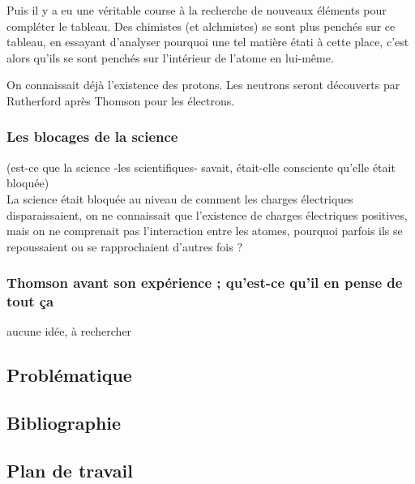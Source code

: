 \documentclass[../main.tex]{subfiles}
\begin{document}
Puis il y a eu une véritable course à la recherche de nouveaux éléments pour compléter le tableau. Des chimistes (et alchmistes) se sont plus penchés sur ce tableau, en essayant d'analyser pourquoi une tel matière étati à cette place, c'est alors qu'ils se sont penchés sur l'intérieur de l'atome en lui-même.

On connaissait déjà l'existence des protons. Les neutrons seront découverts par Rutherford après Thomson pour les électrons. 

\subsubsection{Les blocages de la science }
(est-ce que la science -les scientifiques- savait, était-elle consciente qu'elle était bloquée)\\

La science était bloquée au niveau de comment les charges électriques disparaissaient, on ne connaissait que l'existence de charges électriques positives, mais on ne comprenait pas l'interaction entre les atomes, pourquoi parfois ils se repoussaient ou se rapprochaient d'autres fois ?

\subsubsection{Thomson avant son expérience ; qu'est-ce qu'il en pense de tout ça}
aucune idée, à rechercher 
 
\subsection{Problématique}





\subsection{Bibliographie}


\subsection{Plan de travail}

\end{document}

